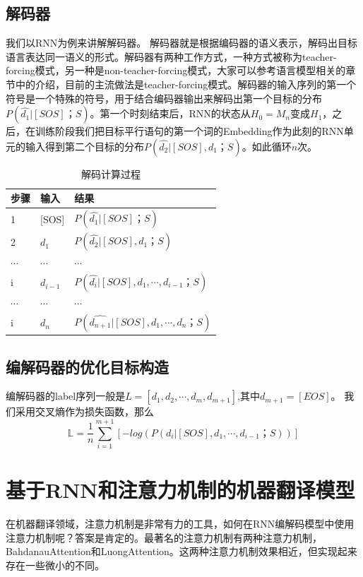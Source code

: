 \documentclass[twoside,a4paper,12pt]{book}%
\begin{document}
\subsection{解码器}
我们以\gls{RNN}为例来讲解解码器。
解码器就是根据编码器的语义表示，解码出目标语言表达同一语义的形式。解码器有两种工作方式，一种方式被称为teacher-forcing模式，另一种是non-teacher-forcing模式，大家可以参考语言模型相关的章节中的介绍，目前的主流做法是teacher-forcing模式。解码器的输入序列的第一个符号是一个特殊的符号，用于结合编码器输出来解码出第一个目标的分布$P(\hat{d_1}|[SOS]；S)$。第一个时刻结束后，\gls{RNN}的状态从$H_0=M_n$变成$H_1$，之后，在训练阶段我们把目标平行语句的第一个词的Embedding作为此刻的\gls{RNN}单元的输入得到第二个目标的分布$P(\hat{d_2}|[SOS],d_1；S)$。如此循环$n$次。
\begin{table}[h]
	\caption{解码计算过程}  
	\centering
		\begin{tabular}{l|l|l}
		  \toprule
		  \midrule
		   步骤 & 输入 & 结果\\
		  \midrule
		  1 & [SOS] & $P(\hat{d_1}|[SOS]；S)$\\
		  \midrule
		  2 & $d_1$ & $P(\hat{d_2}|[SOS],d_1；S)$ \\
		  \midrule
		  $\cdots$ & $\cdots$ & $\cdots$\\
		  \midrule
		  i & $d_{i-1}$ & $P(\hat{d_i}|[SOS],d_1,\cdots,d_{i-1}；S)$ \\
		  \midrule
		  $\cdots$ & $\cdots$ & $\cdots$\\
		  \midrule
		  i & $d_{n}$ & $P(\hat{d_{n+1}}|[SOS],d_1,\cdots,d_{n}；S)$ \\
		  \bottomrule
		\end{tabular}
\end{table}

\subsection{编解码器的优化目标构造}
编解码器的label序列一般是$L=[d_1,d_2,\cdots,d_m,d_{m+1}]$,其中$d_{m+1}=[EOS]$。 
我们采用交叉熵作为损失函数，那么
$$
\mathbb{L} =\frac{1}{n} \sum_{i=1}^{m+1}[-log(P(d_i|[SOS],d_1,\cdots,d_{i-1}；S))]
$$

\section{基于RNN和注意力机制的机器翻译模型}
在机器翻译领域，注意力机制是非常有力的工具，如何在\gls{RNN}编解码模型中使用注意力机制呢？答案是肯定的。最著名的注意力机制有两种注意力机制，BahdanauAttention和LuongAttention。这两种注意力机制效果相近，但实现起来存在一些微小的不同。
\end{document}
